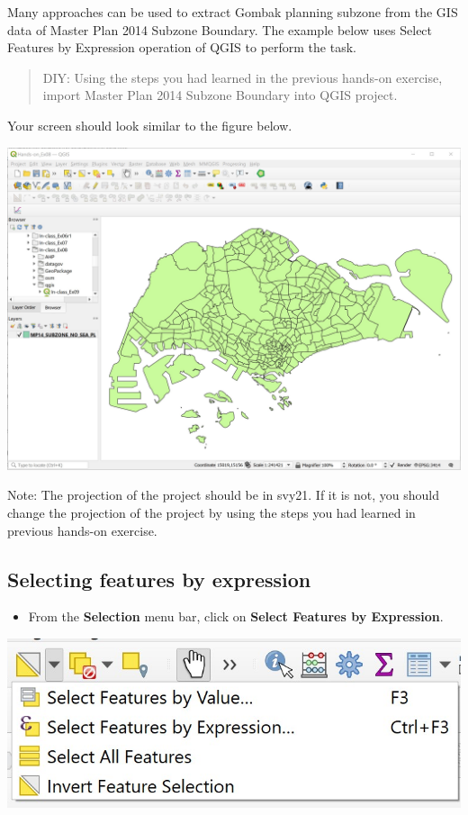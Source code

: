 \documentclass[
  letterpaper,
  DIV=11,
  numbers=noendperiod]{scrreprt}
\providecommand{\tightlist}{%
  \setlength{\itemsep}{0pt}\setlength{\parskip}{0pt}}\usepackage{longtable,booktabs,array}
\begin{document}
Many approaches can be used to extract Gombak planning subzone from the
GIS data of Master Plan 2014 Subzone Boundary. The example below uses
Select Features by Expression operation of QGIS to perform the task.

\begin{quote}
DIY: Using the steps you had learned in the previous hands-on exercise,
import Master Plan 2014 Subzone Boundary into QGIS project.
\end{quote}

Your screen should look similar to the figure below.

\includegraphics{./img07/image1.jpg}

Note: The projection of the project should be in svy21. If it is not,
you should change the projection of the project by using the steps you
had learned in previous hands-on exercise.

\hypertarget{selecting-features-by-expression}{%
\subsection{Selecting features by
expression}\label{selecting-features-by-expression}}

\begin{itemize}
\tightlist
\item
  From the \textbf{Selection} menu bar, click on \textbf{Select Features
  by Expression}.
\end{itemize}

\includegraphics{./img07/image2.jpg}
\end{document}

